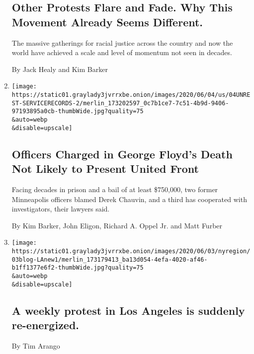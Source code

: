 \begin{enumerate}
  \hypertarget{other-protests-flare-and-fade-why-this-movement-already-seems-different}{%
  \subsection{Other Protests Flare and Fade. Why This Movement Already
  Seems
  Different.}\label{other-protests-flare-and-fade-why-this-movement-already-seems-different}}

  The massive gatherings for racial justice across the country and now
  the world have achieved a scale and level of momentum not seen in
  decades.

  By Jack Healy and Kim Barker
\item
  \href{/2020/06/04/us/george-floyd-police-records-chauvin.html}{}

  \texttt{[image: https://static01.graylady3jvrrxbe.onion/images/2020/06/04/us/04UNREST-SERVICERECORDS-2/merlin\_173202597\_0c7b1ce7-7c51-4b9d-9406-97193895a0cb-thumbWide.jpg?quality=75\\\&auto=webp\\\&disable=upscale]}

  \hypertarget{officers-charged-in-george-floyds-death-not-likely-to-present-united-front}{%
  \subsection{Officers Charged in George Floyd's Death Not Likely to
  Present United
  Front}\label{officers-charged-in-george-floyds-death-not-likely-to-present-united-front}}

  Facing decades in prison and a bail of at least \$750,000, two former
  Minneapolis officers blamed Derek Chauvin, and a third has cooperated
  with investigators, their lawyers said.

  By Kim Barker, John Eligon, Richard A. Oppel Jr. and Matt Furber
\item
  \href{/live/2020/george-floyd-protests-photos-videos-06-03/a-weekly-protest-in-los-angeles-is-suddenly-re-energized}{}

  \texttt{[image: https://static01.graylady3jvrrxbe.onion/images/2020/06/03/nyregion/03blog-LAnew1/merlin\_173179413\_ba13d054-4efa-4020-af46-b1ff1377e6f2-thumbWide.jpg?quality=75\\\&auto=webp\\\&disable=upscale]}

  \hypertarget{a-weekly-protest-in-los-angeles-is-suddenly-re-energized}{%
  \subsection{A weekly protest in Los Angeles is suddenly
  re-energized.}\label{a-weekly-protest-in-los-angeles-is-suddenly-re-energized}}

  By Tim Arango
\end{enumerate}

